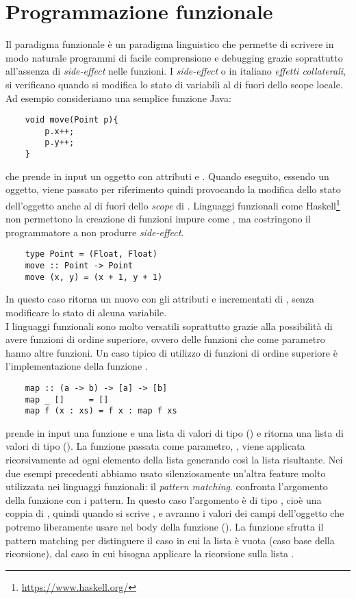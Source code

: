 \section{Programmazione funzionale}
Il paradigma funzionale è un paradigma linguistico che permette di scrivere in modo naturale programmi di facile comprensione e debugging grazie soprattutto all'assenza di \emph{side-effect} nelle funzioni.
I \emph{side-effect} o in italiano \emph{effetti collaterali}, si verificano quando si modifica lo stato di variabili al di fuori dello scope locale. Ad esempio consideriamo una semplice funzione Java:
\begin{verbatim}
	void move(Point p){
		p.x++;
		p.y++;
	}
\end{verbatim} 
che prende in input un oggetto  con attributi  e . Quando eseguito, essendo  un oggetto, viene passato per riferimento
quindi provocando la modifica dello stato dell'oggetto anche al di fuori dello \textit{scope} di . Linguaggi funzionali come Haskell\footnote{\url{https://www.haskell.org/}} non
permettono la creazione di funzioni impure come , ma costringono il programmatore a non produrre \textit{side-effect}.
\begin{verbatim}
	type Point = (Float, Float)
	move :: Point -> Point
	move (x, y) = (x + 1, y + 1)
\end{verbatim}
In questo caso  ritorna un nuovo  con gli attributi  e  incrementati di , senza modificare lo stato di alcuna
variabile.
\\I linguaggi funzionali sono molto versatili soprattutto grazie alla possibilità di avere funzioni di ordine superiore, ovvero delle funzioni che come parametro
hanno altre funzioni. Un caso tipico di utilizzo di funzioni di ordine superiore è l'implementazione della funzione .
\begin{verbatim}
	map :: (a -> b) -> [a] -> [b]
	map _ []     = []
	map f (x : xs) = f x : map f xs
\end{verbatim}
 prende in input una funzione  e una lista di valori di tipo  (\code{[a]}) e ritorna una lista di valori di tipo  (\code{[b]}). La funzione passata come parametro, , viene applicata ricorsivamente ad ogni elemento della lista  generando così la lista risultante. 
Nei due esempi precedenti abbiamo usato silenziosamente un'altra feature molto utilizzata nei linguaggi funzionali: il \textit{pattern matching}.
 confronta l'argomento della funzione con i pattern. In questo caso l'argomento è di tipo , cioè
una coppia di , quindi quando si scrive ,  e  avranno i valori dei campi dell'oggetto 
che potremo liberamente usare nel body della funzione ().
La funzione  sfrutta il pattern matching per distinguere il caso in cui la lista è vuota  (caso base della ricorsione), dal caso in cui
bisogna applicare la ricorsione sulla lista . 


